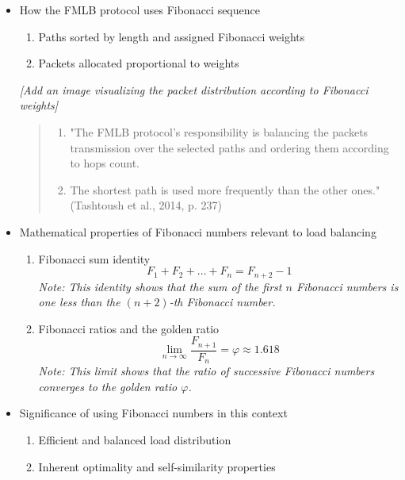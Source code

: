 \documentclass{article}
\begin{document}
\begin{itemize}
    \item How the FMLB protocol uses Fibonacci sequence
    \begin{enumerate}
        \item Paths sorted by length and assigned Fibonacci weights
        \item Packets allocated proportional to weights
    \end{enumerate}
    \textit{[Add an image visualizing the packet distribution according to Fibonacci weights]}
    \begin{quote}
        \begin{enumerate}[label=(\arabic*)]
            \item "The FMLB protocol's responsibility is balancing the packets transmission over the selected paths and 
                  ordering them according to hops count.
            \item The shortest path is used more frequently than the other ones." (Tashtoush et al., 2014, p. 237)
        \end{enumerate}
    \end{quote}
    \item Mathematical properties of Fibonacci numbers relevant to load balancing
    \begin{enumerate}
        \item Fibonacci sum identity
        \begin{equation*}
            F_1 + F_2 + \dots + F_n = F_{n+2} - 1
        \end{equation*}
        \textit{Note: This identity shows that the sum of the first $n$ Fibonacci numbers is one less than the $(n+2)$-th Fibonacci number.}
        \item Fibonacci ratios and the golden ratio
        \begin{equation*}
            \lim_{n \to \infty} \frac{F_{n+1}}{F_n} = \varphi \approx 1.618
        \end{equation*}
        \textit{Note: This limit shows that the ratio of successive Fibonacci numbers converges to the golden ratio $\varphi$.}
    \end{enumerate}
    \item Significance of using Fibonacci numbers in this context
    \begin{enumerate}
        \item Efficient and balanced load distribution
        \item Inherent optimality and self-similarity properties

\end{enumerate}
\end{itemize}
\end{document}
